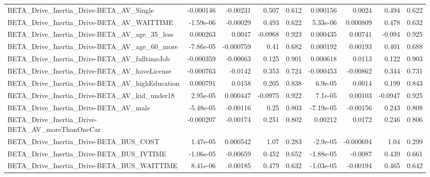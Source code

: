 \begin{tabular}{lrrrrrrrr}
BETA\_Drive\_Inertia\_Drive-BETA\_AV\_Single            &   -0.000146 &     -0.00231 &    0.507 &    0.612 &   0.000156 &      0.0024 &        0.494 &         0.622 \\
BETA\_Drive\_Inertia\_Drive-BETA\_AV\_WAITTIME          &   -1.59e-06 &     -0.00029 &    0.493 &    0.622 &   5.33e-06 &    0.000809 &        0.478 &         0.632 \\
BETA\_Drive\_Inertia\_Drive-BETA\_AV\_age\_35\_less       &    0.000263 &       0.0047 &  -0.0968 &    0.923 &   0.000435 &     0.00741 &       -0.094 &         0.925 \\
BETA\_Drive\_Inertia\_Drive-BETA\_AV\_age\_60\_more       &   -7.86e-05 &    -0.000759 &     0.41 &    0.682 &   0.000192 &     0.00193 &        0.401 &         0.688 \\
BETA\_Drive\_Inertia\_Drive-BETA\_AV\_fulltimeJob       &   -0.000359 &     -0.00663 &    0.125 &    0.901 &   0.000618 &      0.0113 &        0.122 &         0.903 \\
BETA\_Drive\_Inertia\_Drive-BETA\_AV\_haveLicense       &   -0.000763 &      -0.0142 &    0.353 &    0.724 &  -0.000453 &    -0.00862 &        0.344 &         0.731 \\
BETA\_Drive\_Inertia\_Drive-BETA\_AV\_highEducation     &    0.000791 &       0.0158 &    0.205 &    0.838 &    6.9e-05 &      0.0014 &        0.199 &         0.843 \\
BETA\_Drive\_Inertia\_Drive-BETA\_AV\_kid\_under18       &    2.95e-05 &     0.000447 &  -0.0975 &    0.922 &    7.1e-05 &     0.00103 &      -0.0947 &         0.925 \\
BETA\_Drive\_Inertia\_Drive-BETA\_AV\_male              &   -5.48e-05 &     -0.00116 &     0.25 &    0.803 &  -7.19e-05 &    -0.00156 &        0.243 &         0.808 \\
BETA\_Drive\_Inertia\_Drive-BETA\_AV\_moreThanOneCar    &   -0.000207 &     -0.00174 &    0.251 &    0.802 &    0.00212 &      0.0172 &        0.246 &         0.806 \\
BETA\_Drive\_Inertia\_Drive-BETA\_BUS\_COST             &    1.47e-05 &     0.000542 &     1.07 &    0.283 &   -2.9e-05 &   -0.000694 &         1.04 &         0.299 \\
BETA\_Drive\_Inertia\_Drive-BETA\_BUS\_IVTIME           &   -1.06e-05 &     -0.00659 &    0.452 &    0.652 &  -1.88e-05 &     -0.0087 &        0.439 &         0.661 \\
BETA\_Drive\_Inertia\_Drive-BETA\_BUS\_WAITTIME         &    8.41e-06 &      0.00185 &    0.479 &    0.632 &  -1.03e-05 &    -0.00194 &        0.465 &         0.642 \\

\end{tabular}
